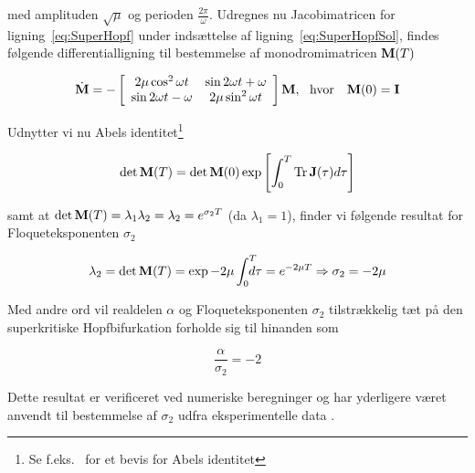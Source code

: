 med amplituden $\sqrt{\mu}$ og perioden
$\frac{2\pi}{\omega}$. Udregnes nu Jacobimatricen for
lig\-ning~\ref{eq:SuperHopf} under inds{\ae}ttelse af
lig\-ning~\ref{eq:SuperHopfSol}, findes f{\o}lgende
differentiallig\-ning til bestemmelse af monodromimatricen
${\bf M}(T)$

\begin{equation}
 \dot{\bf M} = -
 \left[
 \begin{array}{cc}
  2\mu \cos^2\omega t & \sin 2\omega t + \omega \\
  \sin 2\omega t - \omega & 2\mu \sin^2\omega t
 \end{array}
 \right]
 {\bf M}, \mbox{\ \ hvor \ \ } {\bf M}(0) = {\bf I}
\end{equation}

Udnytter vi nu Abels identitet\footnote{Se 
f.eks.\ \cite[s.\ 198]{Saaty} for et bevis for Abels identitet }

\begin{equation}
 \det {\bf M}(T) = 
 \det {\bf M}(0) 
 \exp \left[\int_0^T \mathop{\rm Tr} {\bf J}(\tau) d\tau\right]
\end{equation}

samt at $\det {\bf M}(T) = \lambda_1\lambda_2 = \lambda_2 =
e^{\sigma_2 T}$ (da $\lambda_1 = 1$), finder vi f{\o}lgende
resultat for Floqueteksponenten $\sigma_2$

\begin{equation}
 \lambda_2 = \det {\bf M}(T) = 
 \exp -2\mu\int_0^T\!\!\!\!\!  d\tau = e^{-2\mu T} \Rightarrow
 \sigma_2 = -2 \mu
\end{equation}

Med andre ord vil realdelen $\alpha$ og Floqueteksponenten
$\sigma_2$ tilstr{\ae}kkelig t{\ae}t p{\aa} den
superkritiske Hopfbifurkation forholde sig til hinanden som

\begin{equation}
 \frac{\alpha}{\sigma_2} = -2
\end{equation}

Dette resultat er verificeret ved numeriske beregninger
\cite{SpecRapport} og har yderligere v{\ae}ret anvendt til
bestemmelse af $\sigma_2$ udfra eksperimentelle data
\cite{GinzburgLandau}.

